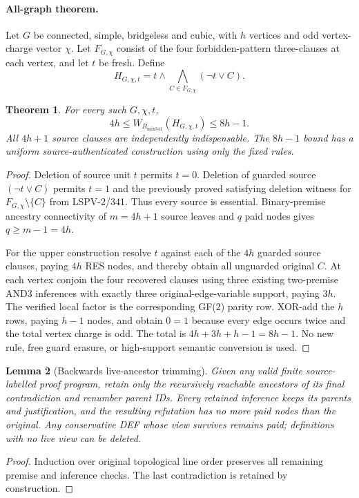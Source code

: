 \documentclass[11pt]{article}
\newtheorem{theorem}{Theorem}
\newtheorem{lemma}[theorem]{Lemma}
\begin{document}
\paragraph{All-graph theorem.}
Let $G$ be connected, simple, bridgeless and cubic, with $h$ vertices and odd vertex-charge vector $\chi$. Let $F_{G,\chi}$ consist of the four forbidden-pattern three-clauses at each vertex, and let $t$ be fresh. Define
\[
H_{G,\chi,t}=t\wedge\bigwedge_{C\in F_{G,\chi}}(\neg t\lor C).
\]
\begin{theorem}
For every such $G,\chi,t$,
\[
\boxed{4h\le W_{R_{\mathrm{mix341}}}(H_{G,\chi,t})\le8h-1.}
\]
All $4h+1$ source clauses are independently indispensable. The $8h-1$ bound has a uniform source-authenticated construction using only the fixed rules.
\end{theorem}
\begin{proof}
Deletion of source unit $t$ permits $t=0$. Deletion of guarded source $(\neg t\lor C)$ permits $t=1$ and the previously proved satisfying deletion witness for $F_{G,\chi}\setminus\{C\}$ from LSPV-2/341. Thus every source is essential. Binary-premise ancestry connectivity of $m=4h+1$ source leaves and $q$ paid nodes gives $q\ge m-1=4h$.

For the upper construction resolve $t$ against each of the $4h$ guarded source clauses, paying $4h$ RES nodes, and thereby obtain all unguarded original $C$. At each vertex conjoin the four recovered clauses using three existing two-premise AND3 inferences with exactly three original-edge-variable support, paying $3h$. The verified local factor is the corresponding GF(2) parity row. XOR-add the $h$ rows, paying $h-1$ nodes, and obtain $0=1$ because every edge occurs twice and the total vertex charge is odd. The total is $4h+3h+h-1=8h-1$. No new rule, free guard erasure, or high-support semantic conversion is used.
\end{proof}

\begin{lemma}[Backwards live-ancestor trimming]
Given any valid finite source-labelled proof program, retain only the recursively reachable ancestors of its final contradiction and renumber parent IDs. Every retained inference keeps its parents and justification, and the resulting refutation has no more paid nodes than the original. Any conservative DEF whose view survives remains paid; definitions with no live view can be deleted.
\end{lemma}
\begin{proof}Induction over original topological line order preserves all remaining premise and inference checks. The last contradiction is retained by construction.\end{proof}
\end{document}
